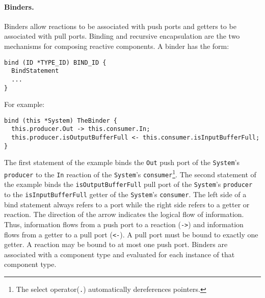 \paragraph{Binders.}
Binders allow reactions to be associated with push ports and getters to be associated with pull ports.
Binding and recursive encapsulation are the two mechanisms for composing reactive components.
A binder has the form:
\begin{verbatim}
bind (ID *TYPE_ID) BIND_ID {
  BindStatement
  ...
}
\end{verbatim}
For example:
\begin{verbatim}
bind (this *System) TheBinder {
  this.producer.Out -> this.consumer.In;
  this.producer.isOutputBufferFull <- this.consumer.isInputBufferFull;
}
\end{verbatim}
The first statement of the example binds the \verb+Out+ push port of the \verb+System+'s \verb+producer+ to the \verb+In+ reaction of the \verb+System+'s \verb+consumer+\footnote{The select operator(\texttt{.}) automatically dereferences pointers.}.
The second statement of the example binds the \verb+isOutputBufferFull+ pull port of the \verb+System+'s \verb+producer+ to the \verb+isInputBufferFull+ getter of the \verb+System+'s \verb+consumer+.
The left side of a bind statement always refers to a port while the right side refers to a getter or reaction.
The direction of the arrow indicates the logical flow of information.
Thus, information flows from a push port to a reaction (\verb+->+) and information flows from a getter to a pull port (\verb+<-+).
A pull port must be bound to exactly one getter.
A reaction may be bound to at most one push port.
Binders are associated with a component type and evaluated for each instance of that component type.

